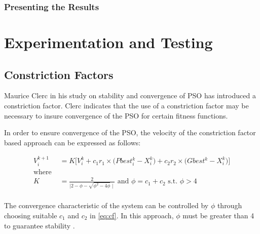 \documentclass{pdfmx4020}
\begin{document}
    \subsection{Presenting the Results} %
    \label{sub:presenting_the_results}
    



\chapter{Experimentation and Testing}

  \section{Constriction Factors} %
  \label{sec:constriction_factors}
    Maurice Clerc in his study on stability and convergence of PSO \cite{constriction_factor} has introduced a constriction factor. Clerc indicates that the use of a constriction factor may be necessary to insure convergence of the PSO for certain fitness functions.

    In order to ensure convergence of the PSO, the velocity of the constriction factor based approach can be expressed as follows:

    \begin{equation} \label{eq:cf}
      \begin{split}
        V_{i}^{k+1} & = K \Bigg[ V_{i}^{k} + c_1 r_1 \times \Big( Pbest_{i}^{k} - X_{i}^{k} \Big) + c_2 r_2 \times \Big( Gbest^{k} - X_{i}^{k} \Big) \Bigg] \\
        \text{where }\\
        K & = \frac{2}{\mid 2 - \phi - \sqrt{\phi^2 -4\phi} \mid} \text{ and } \phi = c_1 + c_2 \text{ s.t. } \phi > 4  \\
      \end{split}
    \end{equation}

    The convergence characteristic of the system can be controlled by $\phi$ through choosing suitable $c_1$ and $c_2$ in \eqref{eq:cf}. In this approach, $\phi$ must be greater than 4 to guarantee stability \cite{constriction_factor_2}.
\end{document}

